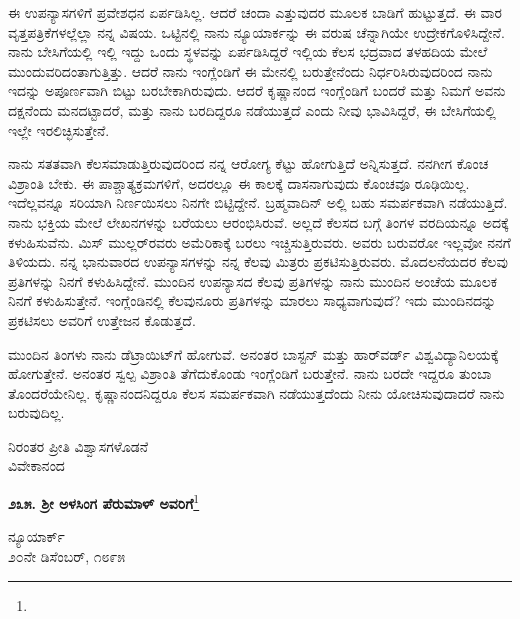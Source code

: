 ಈ ಉಪನ್ಯಾಸಗಳಿಗೆ ಪ್ರವೇಶಧನ ಏರ್ಪಡಿಸಿಲ್ಲ. ಆದರೆ ಚಂದಾ ಎತ್ತುವುದರ ಮೂಲಕ ಬಾಡಿಗೆ ಹುಟ್ಟುತ್ತದೆ. ಈ ವಾರ ವೃತ್ತಪತ್ರಿಕೆಗಳಲ್ಲೆಲ್ಲಾ ನನ್ನ ವಿಷಯ. ಒಟ್ಟಿನಲ್ಲಿ ನಾನು ನ್ಯೂಯಾರ್ಕನ್ನು ಈ ವರುಷ ಚೆನ್ನಾಗಿಯೇ ಉದ್ರೇಕಗೊಳಿಸಿದ್ದೇನೆ. ನಾನು ಬೇಸಿಗೆಯಲ್ಲಿ ಇಲ್ಲಿ ಇದ್ದು ಒಂದು ಸ್ಥಳವನ್ನು ಏರ್ಪಡಿಸಿದ್ದರೆ ಇಲ್ಲಿಯ ಕೆಲಸ ಭದ್ರವಾದ ತಳಹದಿಯ ಮೇಲೆ ಮುಂದುವರಿದಂತಾಗುತ್ತಿತ್ತು. ಆದರೆ ನಾನು ಇಂಗ್ಲೆಂಡಿಗೆ ಈ ಮೇನಲ್ಲಿ ಬರುತ್ತೇನೆಂದು ನಿರ್ಧರಿಸಿರುವುದರಿಂದ ನಾನು ಇದನ್ನು ಅಪೂರ್ಣವಾಗಿ ಬಿಟ್ಟು ಬರಬೇಕಾಗಿರುವುದು. ಆದರೆ ಕೃಷ್ಣಾನಂದ ಇಂಗ್ಲೆಂಡಿಗೆ ಬಂದರೆ ಮತ್ತು ನಿಮಗೆ ಅವನು ದಕ್ಷನೆಂದು ಮನದಟ್ಟಾದರೆ, ಮತ್ತು ನಾನು ಬರದಿದ್ದರೂ ನಡೆಯುತ್ತದೆ ಎಂದು ನೀವು ಭಾವಿಸಿದ್ದರೆ, ಈ ಬೇಸಿಗೆಯಲ್ಲಿ ಇಲ್ಲೇ ಇರಲಿಚ್ಛಿಸುತ್ತೇನೆ.

ನಾನು ಸತತವಾಗಿ ಕೆಲಸಮಾಡುತ್ತಿರುವುದರಿಂದ ನನ್ನ ಆರೋಗ್ಯ ಕೆಟ್ಟು ಹೋಗುತ್ತಿದೆ ಅನ್ನಿಸುತ್ತದೆ. ನನಗೀಗ ಕೊಂಚ ವಿಶ್ರಾಂತಿ ಬೇಕು. ಈ ಪಾಶ್ಚಾತ್ಯಕ್ರಮಗಳಿಗೆ, ಅದರಲ್ಲೂ ಈ ಕಾಲಕ್ಕೆ ದಾಸನಾಗುವುದು ಕೊಂಚವೂ ರೂಢಿಯಿಲ್ಲ. ಇದೆಲ್ಲವನ್ನೂ ಸರಿಯಾಗಿ ನಿರ್ಣಯಿಸಲು ನಿನಗೇ ಬಿಟ್ಟಿದ್ದೇನೆ. ಬ್ರಹ್ಮವಾದಿನ್ ಅಲ್ಲಿ ಬಹು ಸಮರ್ಪಕವಾಗಿ ನಡೆಯುತ್ತಿದೆ. ನಾನು ಭಕ್ತಿಯ ಮೇಲೆ ಲೇಖನಗಳನ್ನು ಬರೆಯಲು ಆರಂಭಿಸಿರುವೆ. ಅಲ್ಲದೆ ಕೆಲಸದ ಬಗ್ಗೆ ತಿಂಗಳ ವರದಿಯನ್ನೂ ಅದಕ್ಕೆ ಕಳುಹಿಸುವೆನು. ಮಿಸ್ ಮುಲ್ಲರ್‌ರವರು ಅಮೆರಿಕಾಕ್ಕೆ ಬರಲು ಇಚ್ಚಿಸುತ್ತಿರುವರು. ಅವರು ಬರುವರೋ ಇಲ್ಲವೋ ನನಗೆ ತಿಳಿಯದು. ನನ್ನ ಭಾನುವಾರದ ಉಪನ್ಯಾಸಗಳನ್ನು ನನ್ನ ಕೆಲವು ಮಿತ್ರರು ಪ್ರಕಟಿಸುತ್ತಿರುವರು. ಮೊದಲನೆಯದರ ಕೆಲವು ಪ್ರತಿಗಳನ್ನು ನಿನಗೆ ಕಳುಹಿಸಿದ್ದೇನೆ. ಮುಂದಿನ ಉಪನ್ಯಾಸದ ಕೆಲವು ಪ್ರತಿಗಳನ್ನು ನಾನು ಮುಂದಿನ ಅಂಚೆಯ ಮೂಲಕ ನಿನಗೆ ಕಳುಹಿಸುತ್ತೇನೆ. ಇಂಗ್ಲೆಂಡಿನಲ್ಲಿ ಕೆಲವುನೂರು ಪ್ರತಿಗಳನ್ನು ಮಾರಲು ಸಾಧ್ಯವಾಗುವುದೆ? ಇದು ಮುಂದಿನದನ್ನು ಪ್ರಕಟಿಸಲು ಅವರಿಗೆ ಉತ್ತೇಜನ ಕೊಡುತ್ತದೆ.

ಮುಂದಿನ ತಿಂಗಳು ನಾನು ಡೆಟ್ರಾಯಿಟ್‌ಗೆ ಹೋಗುವೆ. ಅನಂತರ ಬಾಸ್ಟನ್ ಮತ್ತು ಹಾರ್‌ವರ್ಡ್‌ ವಿಶ್ವವಿದ್ಯಾನಿಲಯಕ್ಕೆ ಹೋಗುತ್ತೇನೆ. ಅನಂತರ ಸ್ವಲ್ಪ ವಿಶ್ರಾಂತಿ ತೆಗೆದುಕೊಂಡು ಇಂಗ್ಲೆಂಡಿಗೆ ಬರುತ್ತೇನೆ. ನಾನು ಬರದೇ ಇದ್ದರೂ ತುಂಬಾ ತೊಂದರೆಯೇನಿಲ್ಲ. ಕೃಷ್ಣಾನಂದನಿದ್ದರೂ ಕೆಲಸ ಸಮರ್ಪಕವಾಗಿ ನಡೆಯುತ್ತದೆಂದು ನೀನು ಯೋಚಿಸುವು\break ದಾದರೆ ನಾನು ಬರುವುದಿಲ್ಲ.

\vspace{-0.5cm}

{\flushright
ನಿರಂತರ ಪ್ರೀತಿ ವಿಶ್ವಾಸಗಳೊಡನೆ\\ವಿವೇಕಾನಂದ\par}

\begin{center}
\textbf{೨೩೫. ಶ‍್ರೀ ಅಳಸಿಂಗ ಪೆರುಮಾಳ್ ಅವರಿಗೆ}\footnote{}
\end{center}

\vspace{-0.7cm}

\begin{flushright}
ನ್ಯೂಯಾರ್ಕ್\\೨೦ನೇ ಡಿಸೆಂಬರ್, ೧೮೯೫
\end{flushright}

\vspace{-0.3cm}

